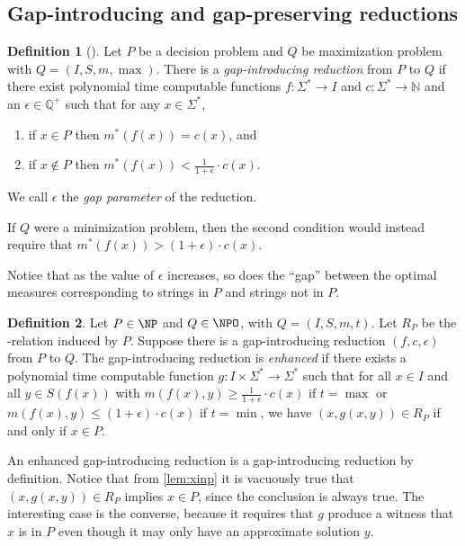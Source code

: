 \documentclass[]{article}
\theoremstyle{plain}
\theoremstyle{definition}
\newtheorem{definition}{Definition}
\begin{document}
\subsection{Gap-introducing and gap-preserving reductions}

\begin{definition}[{\cite[Section~29.1]{vazirani}}]
  Let $P$ be a decision problem and $Q$ be maximization problem with $Q = (I, S, m, \max)$.
  There is a \emph{gap-introducing reduction} from $P$ to $Q$ if there exist polynomial time computable functions $f \colon \Sigma^* \to I$ and $c \colon \Sigma^* \to \mathbb{N}$ and an $\epsilon \in \mathbb{Q}^+$ such that for any $x \in \Sigma^*$,
  \begin{enumerate}
  \item if $x \in P$ then $m^*(f(x)) = c(x)$, and
  \item if $x \notin P$ then $m^*(f(x)) < \frac{1}{1 + \epsilon} \cdot c(x)$.
  \end{enumerate}
  We call $\epsilon$ the \emph{gap parameter} of the reduction.

  If $Q$ were a minimization problem, then the second condition would instead require that $m^*(f(x)) > (1 + \epsilon) \cdot c(x)$.
\end{definition}

Notice that as the value of $\epsilon$ increases, so does the ``gap'' between the optimal measures corresponding to strings in $P$ and strings not in $P$.

\begin{definition}
  Let $P\in\NP$ and $Q\in\NPO$, with $Q = (I, S, m, t)$.
  Let $R_P$ be the \NP-relation induced by $P$.
  Suppose there is a gap-introducing reduction $(f, c, \epsilon)$ from $P$ to $Q$.
  The gap-introducing reduction is \emph{enhanced} if there exists a polynomial time computable function $g \colon I \times \Sigma^* \to \Sigma^*$ such that for all $x \in I$ and all $y \in S(f(x))$ with $m(f(x), y) \geq \frac{1}{1 + \epsilon} \cdot c(x)$ if $t = \max$ or $m(f(x), y) \leq (1 + \epsilon) \cdot c(x)$ if $t = \min$, we have $\left(x, g(x, y)\right) \in R_P$ if and only if $x \in P$.
\end{definition}

An enhanced gap-introducing reduction is a gap-introducing reduction by definition.
Notice that from \autoref{lem:xinp} it is vacuously true that $\left(x, g(x, y)\right) \in R_P$ implies $x \in P$, since the conclusion is always true.
The interesting case is the converse, because it requires that $g$ produce a witness that $x$ is in $P$ even though it may only have an approximate solution $y$.
\end{document}
